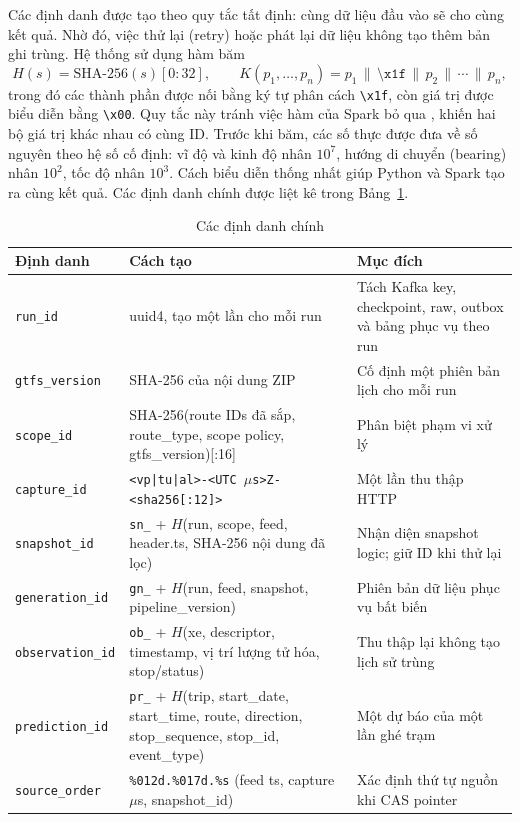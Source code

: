 Các định danh được tạo theo quy tắc tất định: cùng dữ liệu đầu vào sẽ cho cùng kết quả. Nhờ đó, việc thử lại (retry) hoặc phát lại dữ liệu không tạo thêm bản ghi trùng. Hệ thống sử dụng hàm băm
\begin{equation}
H(s) = \text{SHA-256}(s)[0{:}32], \qquad K(p_1,\ldots,p_n) = p_1 \,\|\, \texttt{\textbackslash x1f} \,\|\, p_2 \,\|\, \cdots \,\|\, p_n,
\end{equation}
trong đó các thành phần được nối bằng ký tự phân cách \texttt{\textbackslash x1f}, còn giá trị  được biểu diễn bằng \texttt{\textbackslash x00}. Quy tắc này tránh việc hàm  của Spark bỏ qua , khiến hai bộ giá trị khác nhau có cùng ID. Trước khi băm, các số thực được đưa về số nguyên theo hệ số cố định: vĩ độ và kinh độ nhân $10^7$, hướng di chuyển (bearing) nhân $10^2$, tốc độ nhân $10^3$. Cách biểu diễn thống nhất giúp Python và Spark tạo ra cùng kết quả. Các định danh chính được liệt kê trong Bảng~\ref{tab:ids}.

\begin{table}[H]
\centering
\tablefont
\caption{Các định danh chính}
\label{tab:ids}
\begin{tabular}{p{2.91cm}p{7.37cm}p{4.85cm}}
\toprule
\textbf{Định danh} & \textbf{Cách tạo} & \textbf{Mục đích} \\
\midrule
\texttt{run\_id} & uuid4, tạo một lần cho mỗi run & Tách Kafka key, checkpoint, raw, outbox và bảng phục vụ theo run \\
\texttt{gtfs\_version} & SHA-256 của nội dung ZIP & Cố định một phiên bản lịch cho mỗi run \\
\texttt{scope\_id} & SHA-256(route IDs đã sắp, route\_type, scope policy, gtfs\_version)[:16] & Phân biệt phạm vi xử lý \\
\texttt{capture\_id} & \texttt{<vp|tu|al>-<UTC $\mu$s>Z-<sha256[:12]>} & Một lần thu thập HTTP \\
\texttt{snapshot\_id} & \texttt{sn\_} + $H$(run, scope, feed, header.ts, SHA-256 nội dung đã lọc) & Nhận diện snapshot logic; giữ ID khi thử lại \\
\texttt{generation\_id} & \texttt{gn\_} + $H$(run, feed, snapshot, pipeline\_version) & Phiên bản dữ liệu phục vụ bất biến \\
\texttt{observation\_id} & \texttt{ob\_} + $H$(xe, descriptor, timestamp, vị trí lượng tử hóa, stop/status) & Thu thập lại không tạo lịch sử trùng \\
\texttt{prediction\_id} & \texttt{pr\_} + $H$(trip, start\_date, start\_time, route, direction, stop\_sequence, stop\_id, event\_type) & Một dự báo của một lần ghé trạm \\
\texttt{source\_order} & \texttt{\%012d.\%017d.\%s} (feed ts, capture $\mu$s, snapshot\_id) & Xác định thứ tự nguồn khi CAS pointer \\
\bottomrule
\end{tabular}
\end{table}

